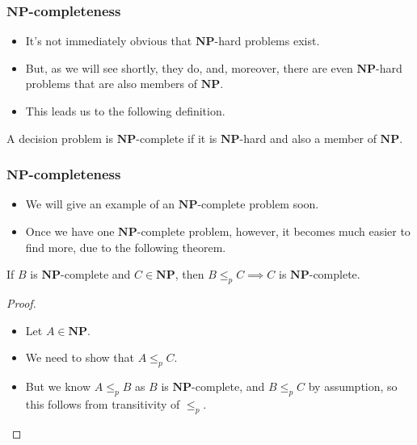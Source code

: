 \documentclass[handout]{beamer}
\newcommand{\NP}{\mathbf{NP}}
\begin{document}
\begin{frame}
\frametitle{$\NP$-completeness}
\begin{itemize}
\item It's not immediately obvious that $\NP$-hard problems exist.
\vspace{0.5cm}
\item But, as we will see shortly, they do, and, moreover, there are even $\NP$-hard problems that are also members of $\NP$. 
\vspace{0.5cm}
\item This leads us to the following definition.  
\end{itemize} 
\vspace{0.5cm}
\begin{definition}[$\NP$-complete]
A decision problem is $\NP$-complete if it is $\NP$-hard and also a member of $\NP$.
\end{definition} 

\end{frame}

\begin{frame}
\frametitle{$\NP$-completeness}
\begin{itemize}
\item We will give an example of an $\NP$-complete problem soon. 
\item Once we have one $\NP$-complete problem, however, it becomes much easier to find more, due to the following theorem.  
\end{itemize} 
\begin{theorem}\label{T:ctrans}
If $B$ is $\NP$-complete and $C\in\NP$, then $B\leq_p C\implies C$ is $\NP$-complete.
\end{theorem}
\begin{proof}
\begin{itemize}
\item Let $A\in \NP$. 
\item We need to show that $A\leq_p C$. 
\item But we know $A\leq_p B$ as $B$ is $\NP$-complete, and $B\leq_p C$ by assumption, so this follows from transitivity of $\leq_p$.
\end{itemize}
\end{proof}
\end{frame}
\end{document}
